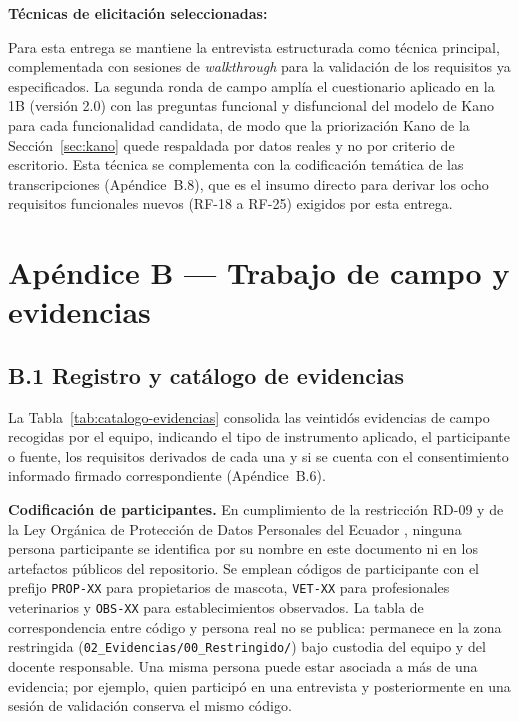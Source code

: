 \documentclass[journal,onecolumn]{IEEEtran}
\begin{document}
	\textbf{Técnicas de elicitación seleccionadas:}
	
	Para esta entrega se mantiene la entrevista estructurada como técnica
	principal, complementada con sesiones de \emph{walkthrough} para la
	validación de los requisitos ya especificados. La segunda ronda de campo
	amplía el cuestionario aplicado en la 1B (versión 2.0) con las preguntas
	funcional y disfuncional del modelo de Kano para cada funcionalidad candidata,
	de modo que la priorización Kano de la Sección~\ref{sec:kano} quede
	respaldada por datos reales y no por criterio de escritorio. Esta técnica se
	complementa con la codificación temática de las transcripciones
	(Apéndice~B.8), que es el insumo directo para derivar los ocho requisitos
	funcionales nuevos (RF-18 a RF-25) exigidos por esta entrega.
	
	\section*{Apéndice B --- Trabajo de campo y evidencias}
	\label{ap:evidencias}
	
	\subsection*{B.1 Registro y catálogo de evidencias}
	
	La Tabla~\ref{tab:catalogo-evidencias} consolida las veintidós evidencias de campo
	recogidas por el equipo, indicando el tipo de instrumento aplicado, el participante
	o fuente, los requisitos derivados de cada una y si se cuenta con el consentimiento
	informado firmado correspondiente (Apéndice~B.6).
	
	\textbf{Codificación de participantes.} En cumplimiento de la restricción
	RD-09 y de la Ley Orgánica de Protección de Datos Personales del Ecuador
	\cite{lopdp2021}, ninguna persona participante se identifica por su nombre
	en este documento ni en los artefactos públicos del repositorio. Se emplean
	códigos de participante con el prefijo \texttt{PROP-XX} para propietarios de
	mascota, \texttt{VET-XX} para profesionales veterinarios y \texttt{OBS-XX}
	para establecimientos observados. La tabla de correspondencia entre código y
	persona real no se publica: permanece en la zona restringida
	(\texttt{02\_Evidencias/00\_Restringido/}) bajo custodia del equipo y del
	docente responsable. Una misma persona puede estar asociada a más de una
	evidencia; por ejemplo, quien participó en una entrevista y posteriormente
	en una sesión de validación conserva el mismo código.
	
\end{document}
